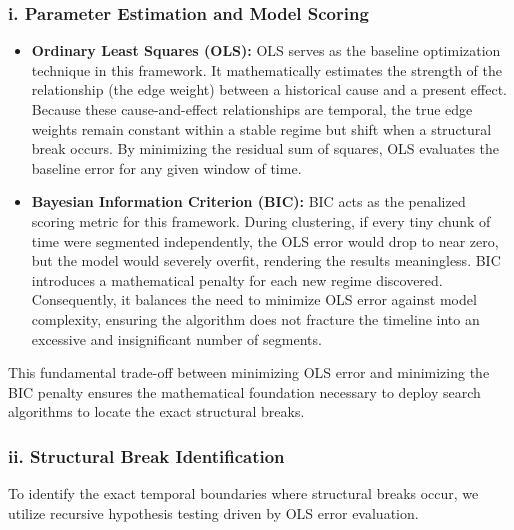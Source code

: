 \subsubsection*{i. Parameter Estimation and Model Scoring}
\begin{itemize}
    \item \textbf{Ordinary Least Squares (OLS):} OLS serves as the baseline optimization technique in this framework. It mathematically estimates the strength of the relationship (the edge weight) between a historical cause and a present effect. Because these cause-and-effect relationships are temporal, the true edge weights remain constant within a stable regime but shift when a structural break occurs. By minimizing the residual sum of squares, OLS evaluates the baseline error for any given window of time.  
    \item \textbf{Bayesian Information Criterion (BIC):} BIC acts as the penalized scoring metric for this framework. During clustering, if every tiny chunk of time were segmented independently, the OLS error would drop to near zero, but the model would severely overfit, rendering the results meaningless. BIC introduces a mathematical penalty for each new regime discovered. Consequently, it balances the need to minimize OLS error against model complexity, ensuring the algorithm does not fracture the timeline into an excessive and insignificant number of segments.  
\end{itemize}

This fundamental trade-off between minimizing OLS error and minimizing the BIC penalty ensures the mathematical foundation necessary to deploy search algorithms to locate the exact structural breaks.

\subsubsection*{ii. Structural Break Identification}
To identify the exact temporal boundaries where structural breaks occur, we utilize recursive hypothesis testing driven by OLS error evaluation.

